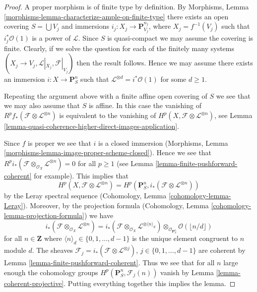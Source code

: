 \begin{proof}
A proper morphism is of finite type by definition.
By Morphisms, Lemma \ref{morphisms-lemma-characterize-ample-on-finite-type}
there exists an open covering $S = \bigcup V_j$ and immersions
$i_j : X_j \to \mathbf{P}^{n_j}_{V_j}$, where $X_j = f^{-1}(V_j)$
such that $i_j^*\mathcal{O}(1)$ is a power of $\mathcal{L}$.
Since $S$ is quasi-compact we may assume the covering is finite.
Clearly, if we solve the question for each of the finitely many
systems $(X_j \to V_j, \mathcal{L}|_{X_j}, \mathcal{F}|_{V_j})$
then the result follows. Hence we may assume there exists an
immersion $i : X \to \mathbf{P}^n_S$ such that
$\mathcal{L}^{\otimes d} = i^*\mathcal{O}(1)$ for some $d \geq 1$.

\medskip\noindent
Repeating the argument above with a finite affine open covering
of $S$ we see that we may also assume that $S$ is affine.
In this case the vanishing of
$R^pf_*(\mathcal{F} \otimes \mathcal{L}^{\otimes n})$
is equivalent to the vanishing of
$H^p(X, \mathcal{F} \otimes \mathcal{L}^{\otimes n})$, see
Lemma \ref{lemma-quasi-coherence-higher-direct-images-application}.

\medskip\noindent
Since $f$ is proper we see that $i$ is a closed immersion
(Morphisms, Lemma \ref{morphisms-lemma-image-proper-scheme-closed}).
Hence we see that
$R^pi_*(\mathcal{F} \otimes_{\mathcal{O}_X} \mathcal{L}^{\otimes n}) = 0$
for all $p \geq 1$ (see Lemma \ref{lemma-finite-pushforward-coherent}
for example). This implies that
$$
H^p(X, \mathcal{F} \otimes \mathcal{L}^{\otimes n})
=
H^p(\mathbf{P}^n_S, i_*(\mathcal{F} \otimes \mathcal{L}^{\otimes n}))
$$
by the Leray spectral sequence
(Cohomology, Lemma \ref{cohomology-lemma-Leray}).
Moreover, by the projection formula
(Cohomology, Lemma \ref{cohomology-lemma-projection-formula})
we have
$$
i_*(\mathcal{F} \otimes_{\mathcal{O}_X} \mathcal{L}^{\otimes n})
=
i_*(\mathcal{F} \otimes_{\mathcal{O}_X}
\mathcal{L}^{\otimes \langle n \rangle_d})
\otimes_{\mathcal{O}_{\mathbf{P}^n_S}}
\mathcal{O}(\lfloor n/d \rfloor)
$$
for all $n \in \mathbf{Z}$ where
$\langle n \rangle_d \in \{0, 1, \ldots, d - 1\}$
is the unique element congruent to $n$ module $d$.
The sheaves $\mathcal{F}_j = i_*(\mathcal{F} \otimes \mathcal{L}^{\otimes j})$,
$j \in \{0, 1, \ldots, d - 1\}$ are coherent by
Lemma \ref{lemma-finite-pushforward-coherent}.
Thus we see that for all $n$ large enough the cohomology groups
$H^p(\mathbf{P}^n_S, \mathcal{F}_j(n))$ vanish by
Lemma \ref{lemma-coherent-projective}.
Putting everything together this implies the lemma.
\end{proof}






